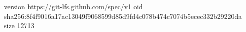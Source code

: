 version https://git-lfs.github.com/spec/v1
oid sha256:8f4f9016a17ac13049f9068599d85d9fd4c078b474c7074b5ecec332b29220da
size 12713
